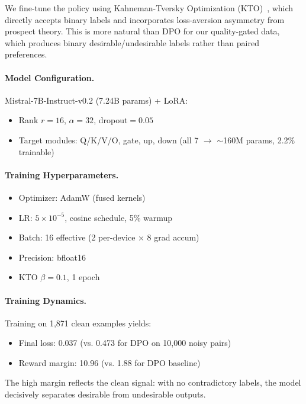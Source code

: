 \documentclass{article}
\begin{document}
We fine-tune the policy using Kahneman-Tversky Optimization (KTO)~\cite{ethayarajh2024kto}, which directly accepts binary labels and incorporates loss-aversion asymmetry from prospect theory.
This is more natural than DPO for our quality-gated data, which produces binary desirable/undesirable labels rather than paired preferences.

\paragraph{Model Configuration.}
Mistral-7B-Instruct-v0.2 (7.24B params) + LoRA:
\begin{itemize}[leftmargin=*,itemsep=0.5ex]
  \item Rank $r{=}16$, $\alpha{=}32$, dropout$=0.05$
  \item Target modules: Q/K/V/O, gate, up, down (all 7 $\rightarrow$ $\sim$160M params, 2.2\% trainable)
\end{itemize}

\paragraph{Training Hyperparameters.}
\begin{itemize}[leftmargin=*,itemsep=0.5ex]
  \item Optimizer: AdamW (fused kernels)
  \item LR: $5 \times 10^{-5}$, cosine schedule, 5\% warmup
  \item Batch: 16 effective (2 per-device $\times$ 8 grad accum)
  \item Precision: bfloat16
  \item KTO $\beta{=}0.1$, 1 epoch
\end{itemize}

\paragraph{Training Dynamics.}
Training on 1,871 clean examples yields:
\begin{itemize}[leftmargin=*,itemsep=0.5ex]
  \item Final loss: 0.037 (vs. 0.473 for DPO on 10,000 noisy pairs)
  \item Reward margin: 10.96 (vs. 1.88 for DPO baseline)
\end{itemize}
The high margin reflects the clean signal: with no contradictory labels, the model decisively separates desirable from undesirable outputs.

\end{document}
